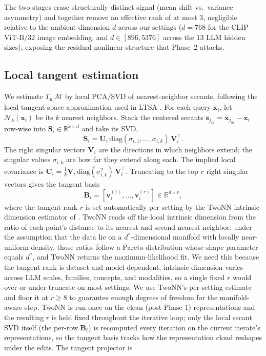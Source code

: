 The two stages erase structurally distinct signal (mean shift vs.\ variance asymmetry) and together remove an effective rank of at most $3$, negligible relative to the ambient dimension $d$ across our settings ($d = 768$ for the CLIP ViT-B/32 image embedding, and $d \in [896, 5376]$ across the 13 LLM hidden sizes), exposing the residual nonlinear structure that Phase~2 attacks.

\subsection{Local tangent estimation}

We estimate $T_{\mathbf{x}_i}\mathcal{M}$ by local PCA/SVD of nearest-neighbor secants, following the local tangent-space approximation used in LTSA \citep{zhang-zha-2004-ltsa}. For each query $\mathbf{x}_i$, let $\mathcal{N}_k(\mathbf{x}_i)$ be its $k$ nearest neighbors. Stack the centered secants $\mathbf{s}_{j_m} = \mathbf{x}_{j_m} - \mathbf{x}_i$ row-wise into $\mathbf{S}_i \in \mathbb{R}^{k \times d}$ and take its SVD,
\begin{equation}
\label{eq:secant_svd}
\mathbf{S}_i = \mathbf{U}_i \, \mathrm{diag}(\sigma_{i,1}, \ldots, \sigma_{i,k}) \, \mathbf{V}_i^\top.
\end{equation}
The right singular vectors $\mathbf{V}_i$ are the directions in which neighbors extend; the singular values $\sigma_{i,k}$ are how far they extend along each. The implied local covariance is $\mathbf{C}_i = \tfrac{1}{k}\mathbf{V}_i \, \mathrm{diag}(\sigma_{i,k}^2) \, \mathbf{V}_i^\top$. Truncating to the top $r$ right singular vectors gives the tangent basis
\begin{equation}
\label{eq:tangent_basis}
\mathbf{B}_i = [\mathbf{v}_i^{(1)}, \ldots, \mathbf{v}_i^{(r)}] \in \mathbb{R}^{d \times r},
\end{equation}
where the tangent rank $r$ is set automatically per setting by the TwoNN intrinsic-dimension estimator of \citet{facco-etal-2017-two-nn}. TwoNN reads off the local intrinsic dimension from the ratio of each point's distance to its nearest and second-nearest neighbor: under the assumption that the data lie on a $d^{*}$-dimensional manifold with locally near-uniform density, those ratios follow a Pareto distribution whose shape parameter equals $d^{*}$, and TwoNN returns the maximum-likelihood fit. We need this because the tangent rank is dataset and model-dependent, intrinsic dimension varies across LLM scales, families, concepts, and modalities, so a single fixed $r$ would over or under-truncate on most settings. We use TwoNN's per-setting estimate and floor it at $r \ge 8$ to guarantee enough degrees of freedom for the manifold-aware step. TwoNN is run once on the clean (post-Phase-1) representations and the resulting $r$ is held fixed throughout the iterative loop; only the local secant SVD itself (the per-row $\mathbf{B}_i$) is recomputed every iteration on the current iterate's representations, so the tangent basis tracks how the representation cloud reshapes under the edits. The tangent projector is
